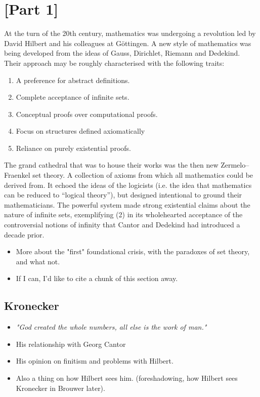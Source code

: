 \section{[Part 1]}
At the turn of the 20th century, mathematics was undergoing a revolution led by David Hilbert and his colleagues at G\"ottingen. A new style of mathematics was being developed from the ideas of Gauss, Dirichlet, Riemann and Dedekind. Their approach may be roughly characterised with the following traits:
\begin{enumerate}
    \item A preference for abstract definitions.
    \item Complete acceptance of infinite sets.
    \item Conceptual proofs over computational proofs.
    \item Focus on structures defined axiomatically
    \item Reliance on purely existential proofs.
\end{enumerate}
The grand cathedral that was to house their works was the then new Zermelo–Fraenkel set theory. A collection of axioms from which all  mathematics could be derived from. It echoed the ideas of the logicists (i.e. the idea that mathematics can be reduced to ``logical theory''), but designed intentional to ground their mathematicians. The powerful system made strong existential claims about the nature of infinite sets, exemplifying (2) in its wholehearted acceptance of the controversial notions of infinity that Cantor and Dedekind had introduced a decade prior.

\begin{itemize}
    \item More about the "first" foundational crisis, with the paradoxes of set theory, and what not.
    \item If I can, I'd like to cite a chunk of this section away.
\end{itemize}

\subsection{Kronecker}
\begin{itemize}
    \item \emph{"God created the whole numbers, all else is the work of man."}
    \item His relationship with Georg Cantor
    \item His opinion on finitism and problems with Hilbert.
    \item Also a thing on how Hilbert sees him. (foreshadowing, how Hilbert sees Kronecker in Brouwer later).
\end{itemize}


